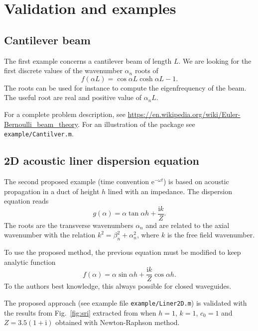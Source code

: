 \documentclass[a4paper,10pt]{article}
\renewcommand{\i}{\mathrm{i}}
\begin{document}
\section{Validation and examples}


\subsection{Cantilever beam}
The first example concerns a cantilever beam of length $L$. We are looking for the first discrete values of the wavenumber $\alpha_n$ roots of 
\begin{equation}
f(\alpha L) = \cos \alpha L \cosh \alpha L -1.
\end{equation}
The roots can be used for instance to compute the eigenfrequency of the beam. The useful root are real and positive value of $\alpha_n L$.

For a complete problem description, see \url{https://en.wikipedia.org/wiki/Euler-Bernoulli_beam_theory}. For an illustration of the package see \texttt{example/Cantilver.m}.

\subsection{2D acoustic liner dispersion equation}
The second proposed example (time convention $\mathrm{e}^{-\omega t}$) is based on acoustic propagation in a duct of height $h$ lined with an impedance. The dispersion equation reads
\begin{equation}
	g(\alpha) = \alpha \tan \alpha h + \frac{\i k}{Z}.
\end{equation}
The roots are the transverse wavenumbers $\alpha_n$ and are related to the axial wavenumber with the relation $k^2 = \beta_n^2 + \alpha_n^2$, where $k$ is the free field wavenumber.

To use the proposed method, the previous equation must be modified to keep analytic function 
\begin{equation}
	f(\alpha) = \alpha \sin \alpha h + \frac{\i k}{Z} \cos \alpha h.
\end{equation}
To the authors best knowledge, this always possible for closed waveguides.



The proposed approach (see example file \texttt{example/Liner2D.m}) is validated with the results from Fig.~\ref{fig:sri} extracted from \cite{Poernomo:2008} when $h=1$, $k=1$, $c_0=1$ and $Z=3.5(1+\i)$  obtained with Newton-Raphson method.
\end{document}
